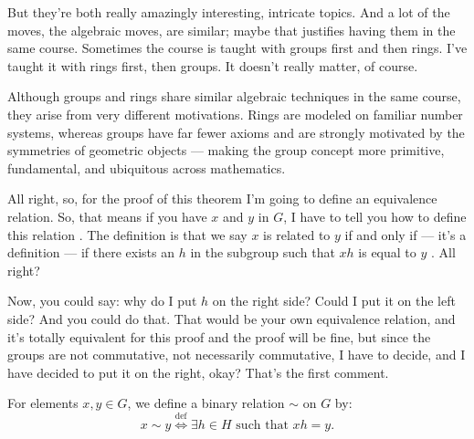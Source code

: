 \begin{proofWrapper}
\begin{speech}[00:13:17 - 00:14:52]
But they're both really amazingly interesting, intricate topics. And a lot of the moves, the algebraic moves, are similar; maybe that justifies having them in the same course. Sometimes the course is taught with groups first and then rings. I've taught it with rings first, then groups. It doesn't really matter, of course.
\end{speech}

\begin{insight}
Although groups and rings share similar algebraic techniques in the same course, they arise from very different motivations. Rings are modeled on familiar number systems, whereas groups have far fewer axioms and are strongly motivated by the symmetries of geometric objects --- making the group concept more primitive, fundamental, and ubiquitous across mathematics.
\end{insight}

\begin{speech}[00:14:52 - 00:15:48]
All right, so, for the proof of this theorem I'm going to define an equivalence relation. So, that means if you have $x$ and $y$ in $G$, I have to tell you how to define this relation . The definition is that we say $x$ is related to $y$ if and only if --- it's a definition --- if there exists an $h$ in the subgroup such that $xh$ is equal to $y$ . All right?

Now, you could say: why do I put $h$ on the right side? Could I put it on the left side? And you could do that. That would be your own equivalence relation, and it's totally equivalent for this proof and the proof will be fine, but since the groups are not commutative, not necessarily commutative, I have to decide, and I have decided to put it on the right, okay? That's the first comment.
\end{speech}

\begin{content}
For elements $x, y \in G$, we define a binary relation $\sim$ on $G$ by:
\begin{equation}\label{eq:coset-equiv-relation}
x \sim y \stackrel{\text{def}}{\iff} \exists h \in H \text{ such that } xh = y.
\end{equation}



\end{content}
\end{proofWrapper}
